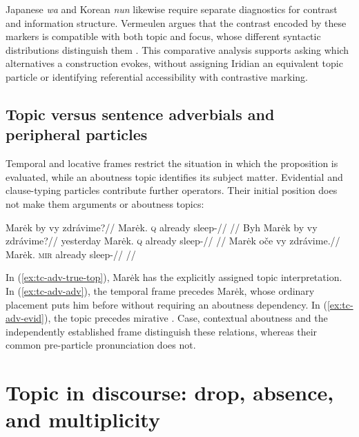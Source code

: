 Japanese \textit{wa} and Korean \textit{nun} likewise require separate
diagnostics for contrast and information structure. Vermeulen argues that
the contrast encoded by these markers is compatible with both topic and
focus, whose different syntactic distributions distinguish them
\cite{vermeulen2013}. This comparative analysis supports asking which
alternatives a construction evokes, without assigning Iridian an equivalent
topic particle or identifying referential accessibility with contrastive marking.

\subsection{Topic versus sentence adverbials and peripheral particles}
\label{sec:tc-adverbials}

Temporal and locative frames restrict the situation in which the proposition
 is evaluated, while an aboutness topic identifies its subject matter.
 Evidential and clause-typing particles contribute further operators. Their
 initial position does not make them arguments or aboutness topics:

\pex\label{ex:tc-adv-contrast}
\a\label{ex:tc-adv-true-top}%
\begingl
\gla Marėk by vy zdrávime?//
\glb Marėk.\Dir{} \textsc{q} already sleep-\Prog{}//
\glft {}
      //
\endgl
\a\label{ex:tc-adv-adv}%
\begingl
\gla Byh Marėk by vy zdrávime?//
\glb yesterday Marėk.\Dir{} \textsc{q} already sleep-\Prog{}//
\glft {}
      //
\endgl
\a\label{ex:tc-adv-evid}%
\begingl
\gla Marėk oče vy zdrávime.//
\glb Marėk.\Dir{} \textsc{mir} already sleep-\Prog{}//
\glft {}
      //
\endgl
\xe

\noindent In (\ref{ex:tc-adv-true-top}), Marėk has the explicitly assigned
 topic interpretation. In (\ref{ex:tc-adv-adv}), the temporal frame precedes
 Marėk, whose ordinary placement puts him before  without requiring
 an aboutness dependency. In (\ref{ex:tc-adv-evid}), the topic
 precedes mirative . Case, contextual aboutness and the independently
 established frame distinguish these relations, whereas their common
 pre-particle pronunciation does not.

\section{Topic in discourse: drop, absence, and multiplicity}\label{sec:tc-discourse}
